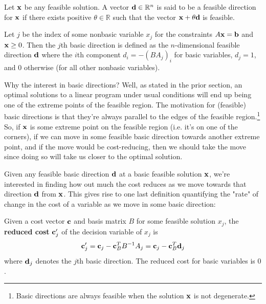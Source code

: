 \documentclass{paper}
\newenvironment{definition}[2][Definition]{\begin{trivlist}
\item[\hskip \labelsep {\bfseries #1}\hskip \labelsep {\bfseries #2.}]}{\end{trivlist}}
\newenvironment{ybox}{\begin{tcolorbox}[breakable,colback=yellow!20!white,colframe=brown!100!black]}{\end{tcolorbox}}
\begin{document}
\bigskip
\begin{ybox}
    \begin{definition}{(Feasible direction)}
        Let $\bold{x}$ be any feasible solution. A vector $\bold{d} \in \mathbb{R}^n$ is said to be a feasible direction for $\bold{x}$ if there exists positive $\theta \in \mathbb{R}$ such that the vector $\bold{x} + \theta\bold{d}$ is feasible.
        
        \medskip
        Let $j$ be the index of some nonbasic variable $x_j$ for the constraints $A\bold{x} = \bold{b}$ and $\bold{x} \geq 0$. Then the $j$th basic direction is defined as the $n$-dimensional feasible direction $\bold{d}$ where the $i$th component $d_i = -(BA_j)_i$ for basic variables, $d_j = 1$, and $0$ otherwise (for all other nonbasic variables).
    \end{definition}
\end{ybox}

\bigskip
Why the interest in basic directions? Well, as stated in the prior section, an optimal solutions to a linear program under usual conditions will end up being one of the extreme points of the feasible region. The motivation for (feasible) basic directions is that they're always parallel to the edges of the feasible region.\footnote{Basic directions are always feasible when the solution $\bold{x}$ is not degenerate.} So, if $\bold{x}$ is some extreme point on the feasible region (i.e. it's on one of the corners), if we can move in some feasible basic direction towards another extreme point, and if the move would be cost-reducing, then we should take the move since doing so will take us closer to the optimal solution.

\medskip
Given any feasible basic direction $\bold{d}$ at a basic feasible solution $\bold{x}$, we're interested in finding how out much the cost reduces as we move towards that direction $\bold{d}$ from $\bold{x}$. This gives rise to one last definition quantifying the "rate" of change in the cost of a variable as we move in some basic direction:

\bigskip
\begin{ybox}
    \begin{definition}{(Reduced cost)}
        Given a cost vector $\bold{c}$ and basis matrix $B$ for some feasible solution $x_j$, the \textbf{reduced cost} $\bold{c}'_j$ of the decision variable of $x_j$ is \[ \bold{c}_j' = \bold{c}_j - \bold{c}_{B}^TB^{-1}A_j = \bold{c}_j - \bold{c}_{B}^T\bold{d}_j \] where $\bold{d}_j$ denotes the $j$th basic direction. The reduced cost for basic variables is $0$.
    \end{definition}
\end{ybox}
\end{document}
